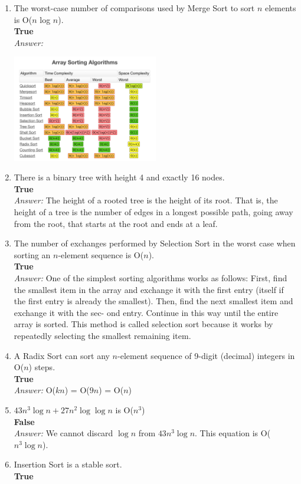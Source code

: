\documentclass[a4paper]{article}
\newcommand{\ans}{\textit{Answer: }}
\begin{document}
\begin{enumerate}
  \item The worst-case number of comparisons used by Merge Sort to sort $n$ elements is
  O($n$ log $n$). \\
  \textbf{True} \\
  \ans
  \begin{center}
    \includegraphics[width=0.5\textwidth]{fig3.png}
  \end{center}

  \item There is a binary tree with height 4 and exactly 16 nodes. \\ 
  \textbf{True} \\
  \ans The height of a rooted tree is the height of its root. That is, the height of a tree is the number of edges in a longest possible path, going away from the root, that starts at the root and ends at a leaf.

  \item The number of exchanges performed by Selection Sort in the worst case when sorting an $n$-element sequence is O($n$). \\
  \textbf{True} \\
  \ans One of the simplest sorting algorithms works as follows: First, find the smallest item in the array and exchange it with the first entry (itself if the first entry is already the smallest). Then, find the next smallest item and exchange it with the sec- ond entry. Continue in this way until the entire array is sorted. This method is called selection sort because it works by repeatedly selecting the smallest remaining item.

  \item A Radix Sort can sort any $n$-element sequence of 9-digit (decimal) integers in O($n$) steps. \\ 
  \textbf{True} \\
  \ans O($kn$) = O($9n$) = O($n$)

  \item  $43n^3\log n + 27n^2 \log \log n$ is O($n^3$) \\
  \textbf{False} \\
  \ans We cannot discard $\log n$ from $43n^3\log n$. This equation is O($n^3\log n$).

  \item Insertion Sort is a stable sort. \\
  \textbf{True} \\

\end{enumerate}
\end{document}

